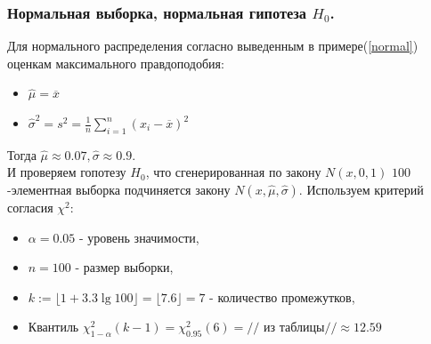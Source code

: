 \documentclass[../body.tex]{subfiles}
\begin{document}
	\subsubsection{Нормальная выборка, нормальная гипотеза $H_0$.}
		Для нормального распределения согласно выведенным в примере(\ref{normal}) оценкам максимального правдоподобия:
		\begin{itemize}
			\item $\hat{\mu} = \overline{x} $
			\item $\hat{\sigma}^2 = s^2 = \frac{1}{n}\sum_{i = 1}^{n}(x_i - \overline{x})^2$
		\end{itemize}
		Тогда $\hat{\mu} \approx 0.07, \hat{\sigma} \approx 0.9$.\\ И проверяем гопотезу $H_0$, что сгенерированная по закону $N(x, 0, 1)$ $100$-элементная выборка подчиняется закону $N(x, \hat{\mu}, \hat{\sigma})$.
		Используем критерий согласия $\chi^2$:
		\begin{itemize}
			\item $\alpha = 0.05$ - уровень значимости,
			\item $n = 100$ - размер выборки,
			\item $k := \lfloor1+3.3\lg 100\rfloor = \lfloor7.6\rfloor = 7$ - количество промежутков,
			\item Квантиль $\chi_{1 - \alpha}^2(k - 1) = \chi_{0.95}^2(6) = //$ из таблицы\cite[с.~358]{math}$// \approx 12.59$
		\end{itemize}
		
\end{document}
